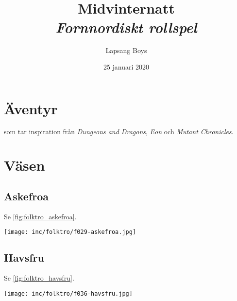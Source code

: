 \documentclass[10pt,twoside,twocolumn,openany]{dndbook}
\title{Midvinternatt \\ \large{\textit{Fornnordiskt rollspel}}}
\author{Lapsang Boys}
\date{25 januari 2020}
\begin{document}
\frontmatter

\maketitle

\tableofcontents

\mainmatter


\chapter{Äventyr}

 som tar inspiration från \emph{Dungeons and Dragons}, \emph{Eon} och \emph{Mutant Chronicles}.


\chapter{Väsen}


\vspace{4em}


\section{Askefroa}

Se \ref{fig:folktro_askefroa}.

\begin{figure*}[htbp]
	\center
	\texttt{[image: inc/folktro/f029-askefroa.jpg]}
	\caption{Askefroa}
	\label{fig:folktro_askefroa}
\end{figure*}


\section{Havsfru}

Se \ref{fig:folktro_havsfru}.

\begin{figure*}[htbp]
	\center
	\texttt{[image: inc/folktro/f036-havsfru.jpg]}
	\caption{Havsfru}
	\label{fig:folktro_havsfru}
\end{figure*}
\end{document}
